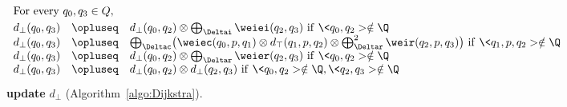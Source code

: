 \begin{figure}[ht]
\(
\begin{array}{lcl}
\multicolumn{3}{l}{%
 \mbox{For~every}\  q_0, q_3 \in Q,}\\[1mm] %
%
d_\bot(q_0, q_3) & \opluseq &
  d_\bot(q_0, q_2) \otimes
  \bigoplus_{\Deltai} \weiei(q_2, q_3)\ 
  \mathrm{if~} \< q_0, q_2> \notin \Q \\
%
d_\bot(q_0, q_3) & \opluseq &
  {\bigoplus_{\Deltac}}
  \bigl(
  \weiec(q_0, p, q_1) \otimes
   d_\top(q_1, p, q_2) \otimes
  \bigoplus^2_{\Deltar} \weir(q_2, p, q_3)\bigr)\ 
  \mathrm{if~} \< q_1, p, q_2> \notin \Q \\
%
d_\bot(q_0, q_3) & \opluseq &
  d_\bot(q_0, q_2) \otimes
  \bigoplus_{\Deltar} \weier(q_2, q_3)\ 
  \mathrm{if~} \< q_0, q_2> \notin \Q \\ 
%
d_\bot(q_0, q_3) & \opluseq &
  d_\bot(q_0, q_2) \otimes d_\bot(q_2, q_3)\  
  \mathrm{if~} \< q_0, q_2>\notin \Q, \< q_2, q_3> \notin \Q \\[-1mm]
\end{array}
\)
\caption{\textbf{update} $d_\bot$ (Algorithm~\ref{algo:Dijkstra}).}
\label{fig:best-update-bottom}
\end{figure}
%


